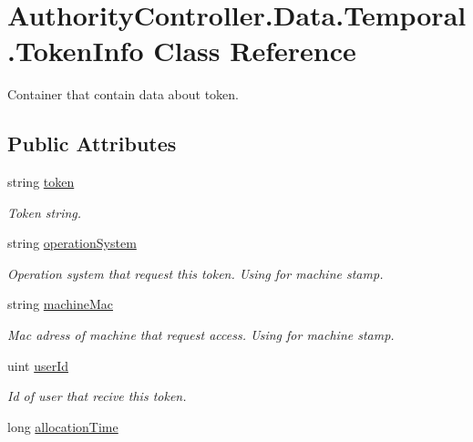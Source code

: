 \hypertarget{class_authority_controller_1_1_data_1_1_temporal_1_1_token_info}{}\section{Authority\+Controller.\+Data.\+Temporal.\+Token\+Info Class Reference}
\label{class_authority_controller_1_1_data_1_1_temporal_1_1_token_info}


Container that contain data about token.  


\subsection*{Public Attributes}
\begin{DoxyCompactItemize}
\item 
string \mbox{\hyperlink{class_authority_controller_1_1_data_1_1_temporal_1_1_token_info_a9856f3e8590d95c39e2c2802b133fef4}{token}}
\begin{DoxyCompactList}\small\item\em Token string. \end{DoxyCompactList}\item 
string \mbox{\hyperlink{class_authority_controller_1_1_data_1_1_temporal_1_1_token_info_a4aa8e73482b707625aa8d1a2a1d580db}{operation\+System}}
\begin{DoxyCompactList}\small\item\em Operation system that request this token. Using for machine stamp. \end{DoxyCompactList}\item 
string \mbox{\hyperlink{class_authority_controller_1_1_data_1_1_temporal_1_1_token_info_a8b2962c8de8ad0d43204fdae97d1393f}{machine\+Mac}}
\begin{DoxyCompactList}\small\item\em Mac adress of machine that request access. Using for machine stamp. \end{DoxyCompactList}\item 
uint \mbox{\hyperlink{class_authority_controller_1_1_data_1_1_temporal_1_1_token_info_ae27c8979079353983244db00920b1501}{user\+Id}}
\begin{DoxyCompactList}\small\item\em Id of user that recive this token. \end{DoxyCompactList}\item 
long \mbox{\hyperlink{class_authority_controller_1_1_data_1_1_temporal_1_1_token_info_acce187b055ae59b52d704b7dfcd4b74d}{allocation\+Time}}

\end{DoxyCompactItemize}
